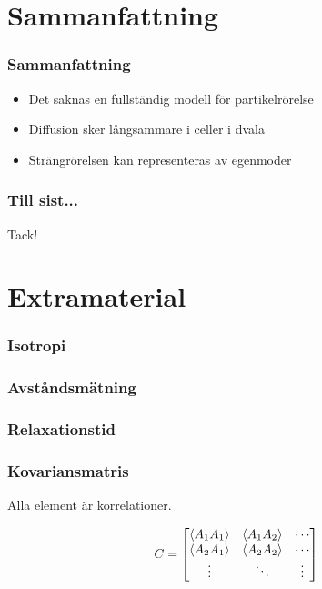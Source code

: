 \documentclass[swedish]{beamer}
\begin{document}
\section{Sammanfattning}
\begin{frame}
\frametitle{Sammanfattning}

\begin{itemize}[label={$\bullet$}]
    
 \item{Det saknas en fullständig modell för partikelrörelse}
\\[8mm]
 \item{Diffusion sker långsammare i celler i dvala}
\\[8mm]
 \item{Strängrörelsen kan representeras av egenmoder}

\end{itemize}

\end{frame}


\begin{frame}
\frametitle{Till sist...}
    \begin{center}
    \huge Tack! 
    \end{center}
\end{frame}

\section{Extramaterial}
\begin{frame}
\frametitle{Isotropi}
\begin{figure}
\resizebox{1\textwidth}{!}{  }
\end{figure}
\end{frame}

\begin{frame}
\frametitle{Avståndsmätning}

\begin{figure}
\resizebox{1\textwidth}{!}{  }
\end{figure}

\end{frame}


\begin{frame}
\frametitle{Relaxationstid}

\begin{figure}
\end{figure}

\end{frame}

\begin{frame}
\frametitle{Kovariansmatris}
Alla element är korrelationer. 

\[
C = 
\begin{bmatrix}
\ev{A_1 A_1} & \ev{A_1 A_2} & \cdots \\
\ev{A_2 A_1} & \ev{A_2 A_2} & \cdots \\
\vdots & \ddots & \vdots
\end{bmatrix}
\]

\end{frame}
\end{document}
